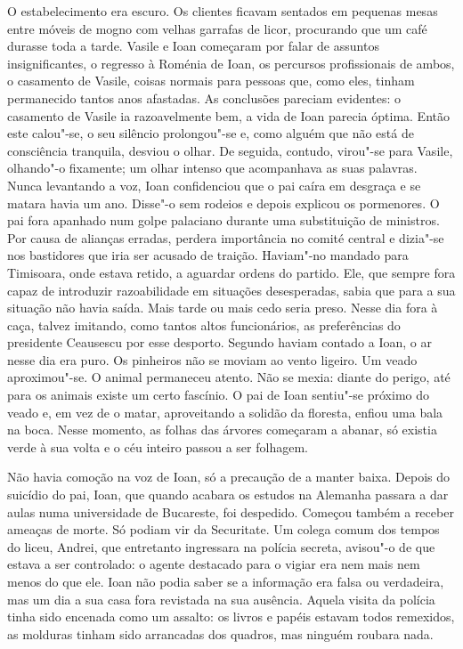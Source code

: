 O estabelecimento era escuro. Os clientes ficavam sentados em pequenas
mesas entre móveis de mogno com velhas garrafas de licor, procurando que
um café durasse toda a tarde. Vasile e Ioan começaram por falar de
assuntos insignificantes, o regresso à Roménia de Ioan, os percursos
profissionais de ambos, o casamento de Vasile, coisas normais para
pessoas que, como eles, tinham permanecido tantos anos afastadas. As
conclusões pareciam evidentes: o casamento de Vasile ia razoavelmente
bem, a vida de Ioan parecia óptima. Então este calou"-se, o seu silêncio
prolongou"-se e, como alguém que não está de consciência tranquila,
desviou o olhar. De seguida, contudo, virou"-se para Vasile, olhando"-o fixamente; um olhar intenso que
acompanhava as suas palavras. Nunca levantando a voz, Ioan
confidenciou que o pai caíra em desgraça e se matara havia um ano.
Disse"-o sem rodeios e depois explicou os pormenores. O pai fora apanhado
num golpe palaciano durante uma substituição de ministros. Por causa de
alianças erradas, perdera importância no comité central e dizia"-se nos
bastidores que iria ser acusado de traição. Haviam"-no mandado para
Timisoara, onde estava retido, a aguardar ordens do partido. Ele, que
sempre fora capaz de introduzir razoabilidade em situações desesperadas, sabia que para a sua situação não havia saída. Mais tarde ou mais
cedo seria preso. Nesse dia fora à caça, talvez imitando, como tantos
altos funcionários, as preferências do presidente Ceausescu por esse
desporto. Segundo haviam contado a Ioan, o ar nesse dia era puro. Os
pinheiros não se moviam ao vento ligeiro. Um veado aproximou"-se. O animal permaneceu atento. Não se mexia: diante do
perigo, até para os animais existe um certo fascínio. O pai de Ioan
sentiu"-se próximo do veado e, em vez de o matar, aproveitando a solidão
da floresta, enfiou uma bala na boca. Nesse momento, as folhas das
árvores começaram a abanar, só existia verde à sua volta e o céu inteiro
passou a ser folhagem.

Não havia comoção na voz de Ioan, só a precaução de a manter baixa.
Depois do suicídio do pai, Ioan, que quando acabara os estudos na
Alemanha passara a dar aulas numa universidade de Bucareste, foi
despedido. Começou também a receber ameaças de morte. Só podiam vir da
Securitate. Um colega comum dos tempos do liceu,
Andrei, que entretanto ingressara na polícia secreta, avisou"-o de que
estava a ser controlado: o agente destacado para o vigiar era nem mais
nem menos do que ele. Ioan não podia saber se a informação era falsa ou
verdadeira, mas um dia a sua casa fora revistada na sua ausência. Aquela
visita da polícia tinha sido encenada como um assalto: os livros e
papéis estavam todos remexidos, as molduras tinham sido arrancadas dos
quadros, mas ninguém roubara nada.

